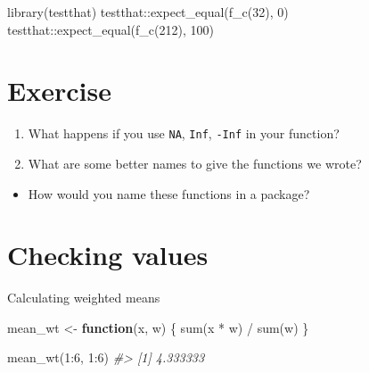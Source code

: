 \documentclass[
]{book}
\newenvironment{Shaded}{\begin{snugshade}}{\end{snugshade}}
\newcommand{\CommentTok}[1]{\textcolor[rgb]{0.56,0.35,0.01}{\textit{#1}}}
\newcommand{\ControlFlowTok}[1]{\textcolor[rgb]{0.13,0.29,0.53}{\textbf{#1}}}
\newcommand{\DecValTok}[1]{\textcolor[rgb]{0.00,0.00,0.81}{#1}}
\newcommand{\FunctionTok}[1]{\textcolor[rgb]{0.00,0.00,0.00}{#1}}
\newcommand{\NormalTok}[1]{#1}
\newcommand{\OtherTok}[1]{\textcolor[rgb]{0.56,0.35,0.01}{#1}}
\newcommand{\SpecialCharTok}[1]{\textcolor[rgb]{0.00,0.00,0.00}{#1}}
\providecommand{\tightlist}{%
  \setlength{\itemsep}{0pt}\setlength{\parskip}{0pt}}
\begin{document}
\begin{Shaded}
\begin{Highlighting}[]
\FunctionTok{library}\NormalTok{(testthat)}
\NormalTok{testthat}\SpecialCharTok{::}\FunctionTok{expect\_equal}\NormalTok{(}\FunctionTok{f\_c}\NormalTok{(}\DecValTok{32}\NormalTok{), }\DecValTok{0}\NormalTok{)}
\NormalTok{testthat}\SpecialCharTok{::}\FunctionTok{expect\_equal}\NormalTok{(}\FunctionTok{f\_c}\NormalTok{(}\DecValTok{212}\NormalTok{), }\DecValTok{100}\NormalTok{)}
\end{Highlighting}
\end{Shaded}

\hypertarget{exercise}{%
\section{Exercise}\label{exercise}}

\begin{enumerate}
\def\labelenumi{\arabic{enumi}.}
\tightlist
\item
  What happens if you use \texttt{NA}, \texttt{Inf}, \texttt{-Inf} in your function?
\item
  What are some better names to give the functions we wrote?
\end{enumerate}

\begin{itemize}
\tightlist
\item
  How would you name these functions in a package?
\end{itemize}

\hypertarget{checking-values}{%
\section{Checking values}\label{checking-values}}

Calculating weighted means

\begin{Shaded}
\begin{Highlighting}[]
\NormalTok{mean\_wt }\OtherTok{\textless{}{-}} \ControlFlowTok{function}\NormalTok{(x, w) \{}
  \FunctionTok{sum}\NormalTok{(x }\SpecialCharTok{*}\NormalTok{ w) }\SpecialCharTok{/} \FunctionTok{sum}\NormalTok{(w)}
\NormalTok{\}}
\end{Highlighting}
\end{Shaded}

\begin{Shaded}
\begin{Highlighting}[]
\FunctionTok{mean\_wt}\NormalTok{(}\DecValTok{1}\SpecialCharTok{:}\DecValTok{6}\NormalTok{, }\DecValTok{1}\SpecialCharTok{:}\DecValTok{6}\NormalTok{)}
\CommentTok{\#\textgreater{} [1] 4.333333}
\end{Highlighting}
\end{Shaded}
\end{document}
